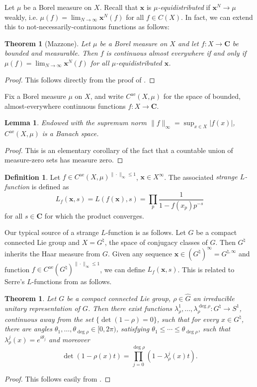 \documentclass{article}
\newcommand{\bC}{\mathbf{C}}
\newcommand{\bx}{{\boldsymbol x}}
\newcommand{\alev}{\mathrm{ae}}
\newtheorem{theorem}[subsection]{Theorem}
\newtheorem{lemma}[subsection]{Lemma}
\theoremstyle{definition}
\newtheorem{definition}[subsection]{Definition}
\begin{document}
Let $\mu$ be a Borel measure on $X$. Recall that $\bx$ is 
\emph{$\mu$-equidistributed} if $\bx^N\to \mu$ weakly, i.e. 
$\mu(f) = \lim_{N\to \infty}\bx^N(f)$ for all $f\in C(X)$. In fact, we can 
extend this to not-necessarily-continuous functions as follows:

\begin{theorem}[Mazzone]
Let $\mu$ be a Borel measure on $X$ and let $f\colon X\to \bC$ be bounded and 
measurable. Then $f$ is continuous almost everywhere if and only if 
$\mu(f)=\lim_{N\to \infty}\bx^N(f)$ for all $\mu$-equidistributed $\bx$. 
\end{theorem}
\begin{proof}
This follows directly from the proof of \cite[Th.1]{mazzone-1995}.
\end{proof}

Fix a Borel measure $\mu$ on $X$, and write $C^\alev(X,\mu)$ for the space of 
bounded, almost-everywhere continuous functions $f\colon X\to \bC$. 


\begin{lemma}
Endowed with the supremum norm $\|f\|_\infty=\sup_{x\in X} |f(x)|$, 
$C^\alev(X,\mu)$ is a Banach space. 
\end{lemma}
\begin{proof}
This is an elementary corollary of the fact that a countable union of 
measure-zero sets has measure zero. 
\end{proof}

\begin{definition}
Let $f\in C^\alev(X,\mu)^{\|\cdot\|_\infty\leqslant 1}$, $\bx\in X^\infty$. The 
associated \emph{strange $L$-function} is defined as 
\[
	L_f(\bx,s) = L(f(\bx),s) = \prod_p \frac{1}{1-f(x_p) p^{-s}} 
\]
for all $s\in \bC$ for which the product converges. 
\end{definition}

Our typical source of a strange $L$-function is as follows. Let $G$ be a 
compact connected Lie group and $X=G^\natural$, the space of conjugacy 
classes of $G$. Then $G^\natural$ inherits the Haar measure from $G$. Given 
any sequence $\bx\in (G^\natural)^\infty = G^{\natural,\infty}$ and 
function $f\in C^\alev(G^\natural)^{\|\cdot\|_\infty\leqslant 1}$, we can 
define $L_f(\bx,s)$. This is 
related to Serre's $L$-functions from \cite[A.2]{serre-1968} as follows. 

\begin{theorem}
Let $G$ be a compact connected Lie group, $\rho\in\widehat G$ an irreducible 
unitary representation of $G$. Then there exist functions 
$\lambda_\rho^1,\dots,\lambda_\rho^{\deg\rho}\colon G^\natural \to S^1$, 
continuous away from the set $\{\det(1-\rho)=0\}$, such that for every 
$x\in G^\natural$, there are angles 
$\theta_1,\dots,\theta_{\deg\rho}\in [0,2\pi)$, satisfying 
$\theta_1\leqslant \cdots \leqslant \theta_{\deg\rho}$, such that 
$\lambda_\rho^j(x) = e^{i \theta_j}$ and moreover
\[
	\det(1-\rho(x) t) = \prod_{j=0}^{\deg \rho} (1-\lambda_\rho^j(x) t) .
\]
\end{theorem}
\begin{proof}
This follows easily from \cite[Lem.1.0.9]{katz-sarnak-1999}. 
\end{proof}
\end{document}
